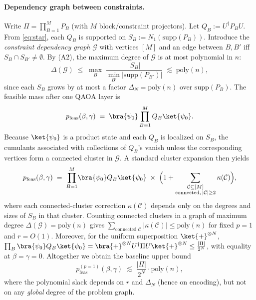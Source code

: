 \documentclass[a4paper,onecolumn,11pt,unpublished]{quantumarticle}
\theoremstyle{remark}
\begin{document}
\paragraph{Dependency graph between constraints.}
Write \(\Pi=\prod_{B=1}^{M}P_B\) (with \(M\) block/constraint projectors).
Let \(Q_B:=U^\dagger P_B U\). From \eqref{eq:star}, each \(Q_B\) is supported on
\(S_B:=N_1(\mathrm{supp}(P_B))\).
Introduce the \emph{constraint dependency graph} \(\mathcal{G}\) with vertices \([M]\) and an edge
between \(B,B'\) iff \(S_B\cap S_{B'}\neq\emptyset\).
By (A2), the maximum degree of \(\mathcal{G}\) is at most polynomial in \(n\):
\[
  \Delta(\mathcal G)
  \;\le\;
  \max_B\;\frac{|S_B|}{\min_{B'} |\mathrm{supp}(P_{B'})|}
  \;\lesssim\; \mathrm{poly}(n),
\]
since each \(S_B\) grows by at most a factor \(\Delta_N=\mathrm{poly}(n)\) over \(\mathrm{supp}(P_B)\).  The feasible mass after one QAOA layer is
\[
  p_{\mathrm{feas}}(\beta,\gamma)
  \;=\;
  \bra{\psi_0}
    \prod_{B=1}^{M} Q_B
  \ket{\psi_0}.
\]
Because \(\ket{\psi_0}\) is a product state and each \(Q_B\) is localized on \(S_B\),
the cumulants associated with collections of \(Q_B\)'s vanish unless the corresponding
vertices form a connected cluster in \(\mathcal{G}\).
A standard cluster expansion then yields
\[
  p_{\mathrm{feas}}(\beta,\gamma)
  \;=\;
  \prod_{B=1}^{M}\!\bra{\psi_0}Q_B\ket{\psi_0}
  \;\times\;
  \Bigl(1 + \sum_{\substack{\mathcal C\subseteq[M]\\ \text{connected},\,|\mathcal C|\ge2}}
     \kappa(\mathcal C)\Bigr),
\]
where each connected-cluster correction \(\kappa(\mathcal C)\) depends only on the
degrees and sizes of \(S_B\) in that cluster.
Counting connected clusters in a graph of maximum degree \(\Delta(\mathcal G)=\mathrm{poly}(n)\) gives
\(
  \sum_{\text{connected }\mathcal C} |\kappa(\mathcal C)|\le \mathrm{poly}(n)
\)
for fixed \(p=1\) and \(r=O(1)\).
Moreover, for the uniform superposition \(\ket{+}^{\otimes N}\),
\(
 \prod_B\bra{\psi_0}Q_B\ket{\psi_0}
 = \bra{+}^{\otimes N}U^\dagger \Pi U\ket{+}^{\otimes N}
 \le \tfrac{|\Pi|}{2^N}
\),
with equality at \(\beta=\gamma=0\).
Altogether we obtain the baseline upper bound
\begin{equation}
  p_{\mathrm{feas}}^{(p=1)}(\beta,\gamma)
  \;\lesssim\;
  \frac{|\Pi|}{2^N}\cdot \mathrm{poly}(n),
  \label{eq:baseline-bound}
\end{equation}
where the polynomial slack depends on \(r\) and \(\Delta_N\) (hence on encoding), but not on any \emph{global} degree of the problem graph.
\end{document}
